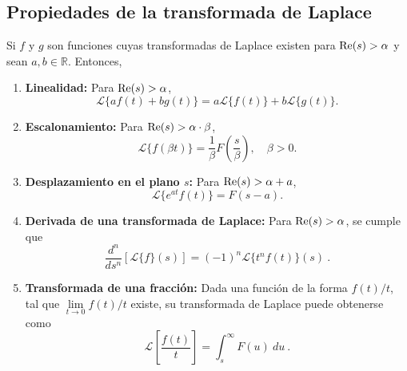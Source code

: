 


\subsection{Propiedades de la transformada de Laplace}    

\begin{propiedad}
    Si $f$ y $g$ son funciones cuyas transformadas de Laplace existen para $\operatorname{Re}(s) > \alpha$ y sean $a, b \in \mathbb{R}$. Entonces, 
\begin{enumerate}
    \item \textbf{Linealidad:} Para $\operatorname{Re}(s) > \alpha$,
    $$\mathcal{L}\{a f(t) + b g(t)\} = a \mathcal{L}\{f(t)\} + b \mathcal{L}\{g(t)\}.$$ 

    \item \textbf{Escalonamiento:} Para $\operatorname{Re}(s) > \alpha \cdot \beta$,
    $$\mathcal{L}\{f(\beta t) \} = \frac{1}{\beta} F \left( \frac{s}{\beta}\right), \quad \beta > 0.$$ 
    
    \item \textbf{Desplazamiento en el plano $s$:} Para $\operatorname{Re}(s) > \alpha + a$,
    $$\mathcal{L}\{e^{at} f(t)\} = F(s-a).$$

    \item \textbf{Derivada de una transformada de Laplace:} Para $\operatorname{Re}(s) > \alpha$, se cumple que
    \begin{equation*}
        \dfrac{d^n}{ds^n} \left[ \mathcal{L}\{f\}(s) \right] = (-1)^n \mathcal{L}\{ t^n f(t) \}(s) \ .
    \end{equation*}

    \item \textbf{Transformada de una fracción:} Dada una función de la forma $f(t)/t$, tal que $\lim\limits_{t \to 0} f(t)/t$ existe, su transformada de Laplace puede obtenerse como 
    \begin{equation*}
        \mathcal{L} \left[ \frac{f(t)}{t} \right] = \int_s^\infty F(u) \ du \ .
    \end{equation*}
\end{enumerate}
\end{propiedad}

